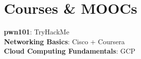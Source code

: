 \documentclass[letterpaper,11pt]{article}
\begin{document}
\section{Courses \& MOOCs}
\begin{itemize}[leftmargin=0.15in, label={}]
    \normalsize{\item{
     \textbf{pwn101}{: TryHackMe} \\
     \textbf{Networking Basics}{: Cisco + Coursera}\\
     \textbf{Cloud Computing Fundamentals}{: GCP} \\
     
    }}
 \end{itemize}
\end{document}
